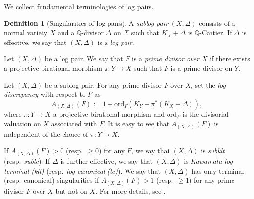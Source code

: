 \documentclass[12pt,twoside]{amsart}
\theoremstyle{definition}
\newtheorem{defn}[thm]{Definition}
\begin{document}
We collect fundamental terminologies of log pairs.
\begin{defn}[Singularities of log pairs]
    A {\it sublog pair} $(X,\Delta)$ consists of a normal variety $X$ and a $\mathbb{Q}$-divisor $\Delta$ on $X$ such that $K_X+\Delta$ is $\mathbb{Q}$-Cartier.
    If $\Delta$ is effective, we say that $(X,\Delta)$ is a {\em log pair}.


Let $(X,\Delta)$ be a log pair.
We say that $F$ is a {\em prime divisor over $X$} if there exists a projective birational morphism $\pi\colon Y\to X$ such that $F$ is a prime divisor on $Y$.


    Let $(X,\Delta)$ be a sublog pair.
    For any prime divisor $F$ over $X$, set the {\it log discrepancy} with respect to $F$ as 
    \[
    A_{(X,\Delta)}(F):=1+\mathrm{ord}_F(K_Y-\pi^*(K_X+\Delta)),
    \]
    where $\pi\colon Y\to X$ a projective birational morphism and $\mathrm{ord}_F$ is the divisorial valuation on $X$ associated with $F$.
    It is easy to see that $A_{(X,\Delta)}(F)$ is independent of the choice of $\pi\colon Y\to X$. 

    If $A_{(X,\Delta)}(F)>0$ (resp.~$\ge0$) for any $F$, we say that $(X,\Delta)$ is {\it subklt} (resp.~{\it sublc}). 
    If $\Delta$ is further effective, we say that $(X,\Delta)$ is  {\it Kawamata log terminal (klt)} (resp.~{\it log canonical (lc)}).
    We say that $(X,\Delta)$  has only terminal (resp.~canonical) singularities if $A_{(X,\Delta)}(F)>1$ (resp.~$\ge1$) for any prime divisor $F$ over $X$ but not on $X$.
    For more details, see \cite{KM}.
\end{defn}
\end{document}
